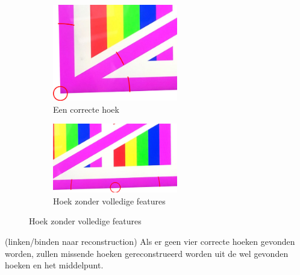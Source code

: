 \begin{figure}[h]
\centering
\begin{subfigure}{0.5\textwidth}
\centering
\includegraphics[width=0.6\textwidth]{img/correctCorner.png}
\caption{Een correcte hoek}
\end{subfigure}%
\begin{subfigure}{0.5\textwidth}
\centering
\includegraphics[width=0.6\textwidth]{img/notACorner.png}
\caption{Hoek zonder volledige features}
\end{subfigure}{}
\end{figure}

(linken/binden naar reconstruction) Als er geen vier correcte hoeken gevonden worden, zullen missende hoeken gereconstrueerd worden uit de wel gevonden hoeken en het middelpunt.